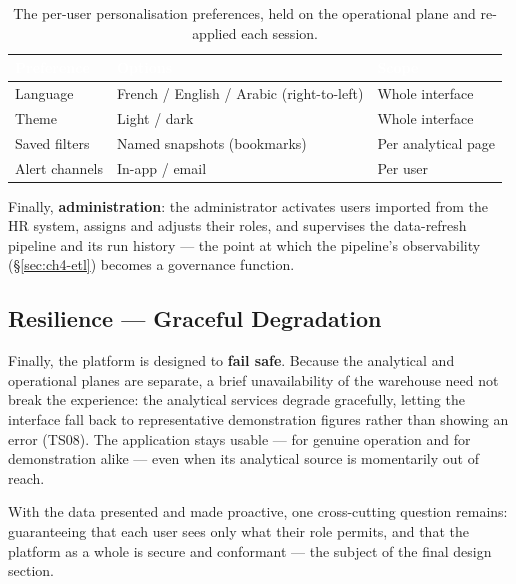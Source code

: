 \begin{table}[H]
\centering
\caption{The per-user personalisation preferences, held on the operational plane and re-applied each
session.}
\label{tab:ch4-app-prefs}
\renewcommand{\arraystretch}{1.3}
\begin{tabularx}{\linewidth}{|>{\raggedright\arraybackslash}p{3.2cm}|>{\raggedright\arraybackslash}X|>{\raggedright\arraybackslash}p{3.6cm}|}
\hline
\rowcolor{tblheader}
\textcolor{white}{\textbf{Preference}} & \textcolor{white}{\textbf{Options}} &
\textcolor{white}{\textbf{Scope}} \\
\hline
Language & French / English / Arabic (right-to-left) & Whole interface \\
Theme & Light / dark & Whole interface \\
Saved filters & Named snapshots (bookmarks) & Per analytical page \\
Alert channels & In-app / email & Per user \\
\hline
\end{tabularx}
\end{table}

Finally, \textbf{administration}: the administrator activates users imported from the HR system, assigns
and adjusts their roles, and supervises the data-refresh pipeline and its run history --- the point at
which the pipeline's observability (\S\ref{sec:ch4-etl}) becomes a governance function.

\subsection{Resilience --- Graceful Degradation}

Finally, the platform is designed to \textbf{fail safe}. Because the analytical and operational planes
are separate, a brief unavailability of the warehouse need not break the experience: the analytical
services degrade gracefully, letting the interface fall back to representative demonstration figures
rather than showing an error (TS08). The application stays usable --- for genuine operation and for
demonstration alike --- even when its analytical source is momentarily out of reach.

With the data presented and made proactive, one cross-cutting question remains: guaranteeing that each
user sees only what their role permits, and that the platform as a whole is secure and conformant ---
the subject of the final design section.

